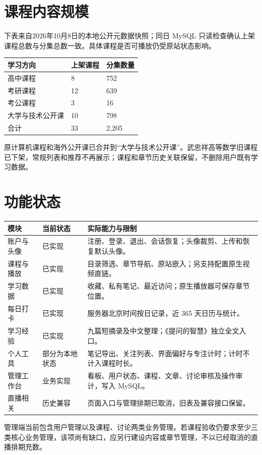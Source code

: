 \documentclass[UTF8,12pt,a4paper,openany,oneside]{ctexbook}
\newcommand{\revisiondate}{2026年10月8日}
\begin{document}
\section{课程内容规模}
下表来自\revisiondate 的本地公开元数据快照；同日 MySQL 只读检查确认上架课程总数与分集总数一致。具体课程是否可播放仍受原站状态影响。
{\small
\begin{longtable}{P{0.48\textwidth}P{0.18\textwidth}P{0.18\textwidth}}
\toprule 学习方向 & 上架课程 & 分集数量 \\ \midrule
高中课程 & 8 & 752 \\
考研课程 & 12 & 639 \\
考公课程 & 3 & 16 \\
大学与技术公开课 & 10 & 798 \\
\midrule 合计 & 33 & 2,205 \\
\bottomrule
\end{longtable}}
原计算机课程和海外公开课已合并到“大学与技术公开课”。武忠祥高等数学旧课程已下架，常规列表和推荐不再展示；课程和章节历史关联保留，不删除用户既有学习数据。

\section{功能状态}
{\small
\begin{longtable}{P{0.20\textwidth}P{0.19\textwidth}P{0.48\textwidth}}
\toprule 模块 & 当前状态 & 实际能力与限制 \\ \midrule
账户与头像 & 已实现 & 注册、登录、退出、会话恢复；头像裁剪、上传和恢复默认头像。 \\
课程与播放 & 已实现 & 目录筛选、章节导航、原站嵌入；另支持配置原生视频直链。 \\
学习数据 & 已实现 & 收藏、私有笔记、最近访问；原生播放器可保存章节位置。 \\
每日打卡 & 已实现 & 服务器北京时间按日记录，近 365 天日历与统计。 \\
学习经验 & 已实现 & 九篇短摘录及中文整理；《提问的智慧》独立全文入口。 \\
个人工具 & 部分为本地状态 & 笔记导出、关注列表、界面偏好与专注计时；计时不计入课程时长。 \\
管理工作台 & 业务实现 & 看板、用户状态、课程、文章、讨论审核及操作审计，写入 MySQL。 \\
直播相关 & 历史兼容 & 页面入口与管理排期已取消，旧表及兼容接口保留。 \\
\bottomrule
\end{longtable}}
管理端当前包含用户管理以及课程、讨论两类业务管理。若课程验收仍要求至少三类核心业务管理，该项尚有缺口，应另行建设内容或章节管理，不以已经取消的直播排期充数。
\end{document}
